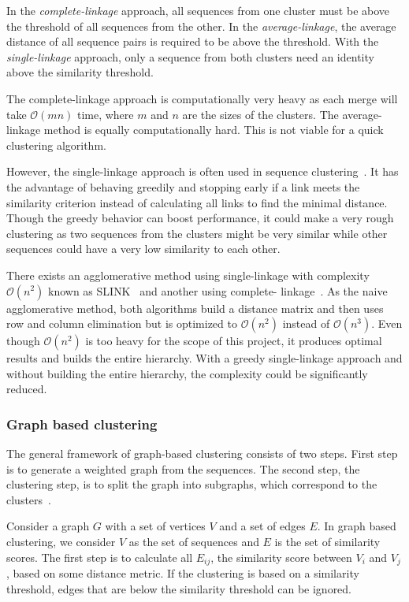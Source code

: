 In the \textit{complete-linkage} approach, all sequences from one cluster must
be above the threshold of all sequences from the other. In the
\textit{average-linkage}, the average distance of all sequence pairs is
required to be above the threshold. With the \textit{single-linkage} approach,
only a sequence from both clusters need an identity above the similarity
threshold.

The complete-linkage approach is computationally very heavy as each merge will
take $\mathcal{O}(mn)$ time, where $m$ and $n$ are the sizes of the clusters.
The average-linkage method is equally computationally hard. This is not viable
for a quick clustering algorithm.

However, the single-linkage approach is often used in sequence
clustering~\cite[pp. 62-63]{dong}. It has the advantage of behaving greedily
and stopping early if a link meets the similarity criterion instead of
calculating all links to find the minimal distance. Though the greedy behavior
can boost performance, it could make a very rough clustering as two sequences
from the clusters might be very similar while other sequences could have a very
low similarity to each other.

There exists an agglomerative method using single-linkage with complexity
$\mathcal{O}(n^2)$ known as SLINK~\cite{sibson} and another using complete-
linkage~\cite{defays}. As the naive agglomerative method, both algorithms build
a distance matrix and then uses row and column elimination but is optimized to
$\mathcal{O}(n^2)$ instead of $\mathcal{O}(n^3)$. Even though $\mathcal{O}(n^2)$
is too heavy for the scope of this project, it produces optimal results and
builds the entire hierarchy. With a greedy single-linkage approach and without
building the entire hierarchy, the complexity could be significantly reduced.

\subsubsection{Graph based clustering}

The general framework of graph-based clustering consists of two steps. First
step is to generate a weighted graph from the sequences. The second step, the
clustering step, is to split the graph into subgraphs, which correspond to the
clusters~\cite[pp. 64-65]{dong}.

Consider a graph $G$ with a set of vertices $V$ and a set of edges $E$. In
graph based clustering, we consider $V$ as the set of sequences and $E$ is the
set of similarity scores. The first step is to calculate all $E_{ij}$, the
similarity score between $V_i$ and $V_j$, based on some distance metric. If the
clustering is based on a similarity threshold, edges that are below the
similarity threshold can be ignored.

